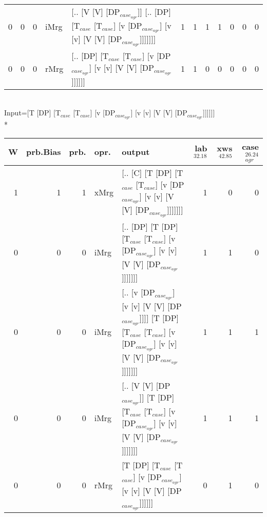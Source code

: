 \begin{tabularx}{\linewidth}{rrrlXrrrrrrr}
   0 &       0 &   0 & iMrg & [.. [V [V] [DP$_{case_{agr}}$]] [.. [DP] [T$_{case}$ [T$_{case}$] [v [DP$_{case_{agr}}$] [v [v] [V [V] [DP$_{case_{agr}}$]]]]]]]                                             &             1 &             1 &                  1 &            1 &              0 &               0 &              0 \\
   0 &       0 &   0 & rMrg & [.. [DP] [T$_{case}$ [T$_{case}$] [v [DP$_{case_{agr}}$] [v [v] [V [V] [DP$_{case_{agr}}$]]]]]]                                                                        &             1 &             1 &                  0 &            0 &              0 &               0 &              0 \\
\hline
\end{tabularx}\endgroup\\
\begingroup\scriptsize Input=[T [DP] [T$_{case}$ [T$_{case}$] [v [DP$_{case_{agr}}$] [v [v] [V [V] [DP$_{case_{agr}}$]]]]]]\\*
\begin{tabularx}{\linewidth}{rrrlXrrr}
\hline
   W &   prb.Bias &   prb. & opr.   & output                                                                                                                          &   lab$^{32.18}$ &   xws$^{42.85}$ &   case$_{agr}^{26.24}$ \\
\hline
   1 &       1 &   1 & xMrg & [.. [C] [T [DP] [T$_{case}$ [T$_{case}$] [v [DP$_{case_{agr}}$] [v [v] [V [V] [DP$_{case_{agr}}$]]]]]]]                                             &             1 &             0 &                  0 \\
   0 &       0 &   0 & iMrg & [.. [DP] [T [DP] [T$_{case}$ [T$_{case}$] [v [DP$_{case_{agr}}$] [v [v] [V [V] [DP$_{case_{agr}}$]]]]]]]                                            &             1 &             1 &                  0 \\
   0 &       0 &   0 & iMrg & [.. [v [DP$_{case_{agr}}$] [v [v] [V [V] [DP$_{case_{agr}}$]]]] [T [DP] [T$_{case}$ [T$_{case}$] [v [DP$_{case_{agr}}$] [v [v] [V [V] [DP$_{case_{agr}}$]]]]]]] &             1 &             1 &                  1 \\
   0 &       0 &   0 & iMrg & [.. [V [V] [DP$_{case_{agr}}$]] [T [DP] [T$_{case}$ [T$_{case}$] [v [DP$_{case_{agr}}$] [v [v] [V [V] [DP$_{case_{agr}}$]]]]]]]                           &             1 &             1 &                  1 \\
   0 &       0 &   0 & rMrg & [T [DP] [T$_{case}$ [T$_{case}$] [v [DP$_{case_{agr}}$] [v [v] [V [V] [DP$_{case_{agr}}$]]]]]]                                                      &             0 &             1 &                  0 \\
\hline
\end{tabularx}\endgroup\\
